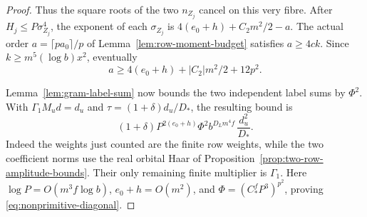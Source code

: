 \begin{proof}
Thus the square roots of the two \(n_{Z_j}\) cancel on this very
fibre. After \(H_j\le P\sigma_{Z_j}^4\), the exponent of each
\(\sigma_{Z_j}\) is \(4(e_0+h)+C_2m^2/2-a\).
The actual order \(a=\lceil pa_0\rceil/p\) of
Lemma~\ref{lem:row-moment-budget} satisfies \(a\ge4ck\).
Since \(k\ge m^5(\log b)x^2\), eventually
\[
        a\ge4(e_0+h)+|C_2|m^2/2+12p^2 .
\]

Lemma~\ref{lem:gram-label-sum} now bounds the two independent
label sums by \(\Phi^2\). With
\(\Gamma_1M_ud=d_u\) and \(\tau=(1+\delta)d_u/D_*\),
the resulting bound is
\[
     (1+\delta)P^{2(e_0+h)}\Phi^2 b^{D_Lm^4f}\,\frac{d_u^2}{D_*}.
\]
Indeed the weights just counted are the finite row weights, while
the two coefficient norms use the real orbital Haar of
Proposition~\ref{prop:two-row-amplitude-bounds}.
Their only remaining finite multiplier is \(\Gamma_1\).
Here \(\log P=O(m^3f\log b)\), \(e_0+h=O(m^2)\), and
\(\Phi=(C_*^fP^3)^{p^2}\), proving \eqref{eq:nonprimitive-diagonal}.
\end{proof}
